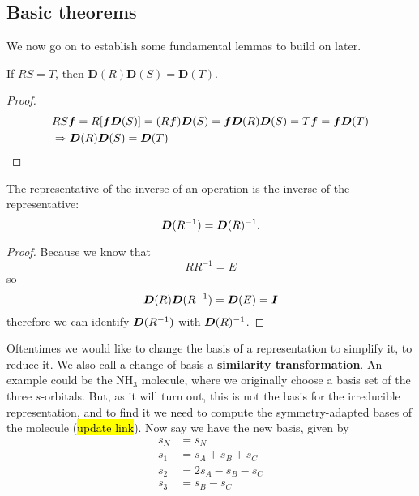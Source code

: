 \subsection{Basic theorems}
We now go on to establish some fundamental lemmas to build on later.
\begin{lemma}
If $RS=T$, then $\boldsymbol{D}(R)\boldsymbol{D}(S)=\boldsymbol{D}(T)$.
\end{lemma}
\begin{proof}
\begin{equation}
\begin{aligned}
&RS\boldsymbol{f}=R[\boldsymbol{f}\boldsymbol{D}(S)]=(R\boldsymbol{f})\boldsymbol{D}(S)=\boldsymbol{f}\boldsymbol{D}(R)\boldsymbol{D}(S)=T\boldsymbol{f}=\boldsymbol{f}\boldsymbol{D}(T)\\
&\Rightarrow \boldsymbol{D}(R)\boldsymbol{D}(S)=\boldsymbol{D}(T)
\end{aligned}
\end{equation}
\end{proof}
\begin{lemma}
The representative of the inverse of an operation is 
the inverse of the representative: 
\begin{equation}
\boldsymbol{D}(R^{-1})=\boldsymbol{D}(R)^{-1}. 
\end{equation}
\end{lemma}
\begin{proof}
Because we know that
\begin{equation}
RR^{-1}=E
\end{equation}
so
\begin{equation}
\boldsymbol{D}(R)\boldsymbol{D}(R^{-1})=\boldsymbol{D}(E)=\boldsymbol{I}
\end{equation}
therefore we can identify $\boldsymbol{D}(R^{-1})$ with $\boldsymbol{D}(R)^{-1}$.
\end{proof}
Oftentimes we would like to change the basis of a representation to simplify it, 
\ie to reduce it. We also call a change of basis a 
\textbf{similarity transformation}. An example could be the NH$_3$ molecule, where 
we originally choose a basis set of the three $s$-orbitals. But, as it will turn 
out, this is not the basis for the irreducible representation, and to find it we 
need to compute the symmetry-adapted bases of the molecule (\hl{update link}). 
Now say we have the new basis, given by 
\begin{equation*}
\begin{aligned}
s_N&=s_N\\
s_1&=s_A+s_B+s_C\\
s_2&=2s_A-s_B-s_C\\
s_3&=s_B-s_C
\end{aligned}
\end{equation*}
